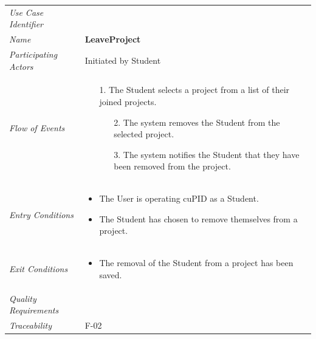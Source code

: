 \documentclass[12pt,letterpaper]{article}
\begin{document}
\begin{center}
	\begin{tabu} to 
		\toprule
		Use Case Identifier & \leaveproject{} \\
		Name & {\bf LeaveProject} \\
		Participating Actors & Initiated by Student \\
		Flow of Events & 
		\begin{minipage}[t]{\linewidth}
		    \begin{enumerate}
			    \item[1.] The Student selects a project from a list of their joined projects.
			    \begin{enumerate}
			    		\item[2.] The system removes the Student from the selected project.
					\item[3.] The system notifies the Student that they have been removed from the project.
			    \end{enumerate}
			\end{enumerate}
		\end{minipage} \\

		Entry Conditions &
		\begin{minipage}[t]{\linewidth}
			\begin{itemize}
			    \item The User is operating cuPID as a Student.
			    \item The Student has chosen to remove themselves from a project.
	        \end{itemize}
		\end{minipage} \\

		Exit Conditions &
		\begin{minipage}[t]{\linewidth}
			\begin{itemize}
			    \item The removal of the Student from a project has been saved.
	        \end{itemize}
		\end{minipage} \\

		Quality Requirements & \\

		Traceability & F-02 \\
		\toprule
	\end{tabu}
\end{center}
\end{document}
